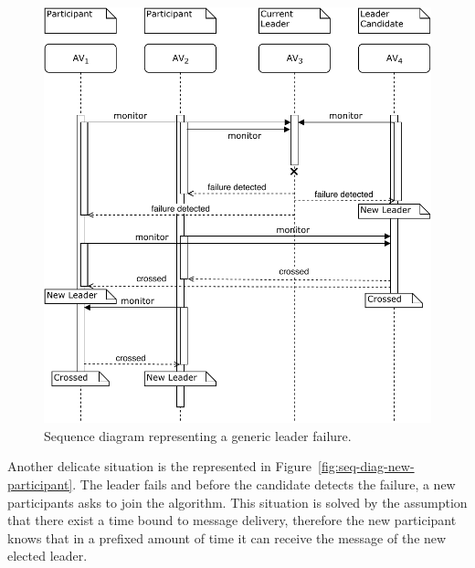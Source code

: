 \documentclass{memoir}
\begin{document}
\begin{figure}
	\centering
	\includegraphics[width=\linewidth]{sequence_diagrams/leader_sw_failure.pdf}
	\caption{Sequence diagram representing a generic leader failure.}
	\label{fig:seq-diag-leader-sw-failure}
\end{figure}


Another delicate situation is the represented in Figure~\ref{fig:seq-diag-new-participant}. The leader fails and before the candidate detects the failure, a new participants asks to join the algorithm. This situation is solved by the assumption that there exist a time bound to message delivery, therefore the new participant knows that in a prefixed amount of time it can receive the message of the new elected leader.
\end{document}
